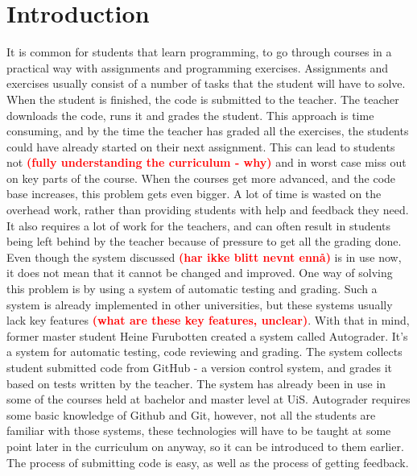 \documentclass[12pt,a4paper]{report}
\newcommand\worry[1]{\textcolor{red}{\textbf{\small{(#1)}}}}
\begin{document}
\chapter*{Introduction}

It is common for students that learn programming, to go through courses in a practical way with assignments and programming exercises. Assignments and exercises usually consist of a number of tasks that the student will have to solve. When the student is finished, the code is submitted to the teacher. The teacher downloads the code, runs it and grades the student. This approach is time consuming, and by the time the teacher has graded all the exercises, the students could have already started on their next assignment. This can lead to students not \worry{fully understanding the curriculum - why} and in worst case miss out on key parts of the course. When the courses get more advanced, and the code base increases, this problem gets even bigger. A lot of time is wasted on the overhead work, rather than providing students with help and feedback they need. It also requires a lot of work for the teachers, and can often result in students being left behind by the teacher because of pressure to get all the grading done. Even though the system discussed \worry{har ikke blitt nevnt ennå} is in use now, it does not mean that it cannot be changed and improved. One way of solving this problem is by using a system of automatic testing and grading. Such a system is already implemented in other universities, but these systems usually lack key features \worry{what are these key features, unclear}. With that in mind, former master student Heine Furubotten created a system called Autograder. It's a system for automatic testing, code reviewing and grading. The system collects student submitted code from GitHub - a version control system, and grades it based on tests written by the teacher. The system has already been in use in some of the courses held at bachelor and master level at UiS. Autograder requires some basic knowledge of Github and Git, however, not all the students are familiar with those systems, these technologies will have to be taught at some point later in the curriculum on anyway, so it can be introduced to them earlier. The process of submitting code is easy, as well as the process of getting feedback.
\end{document}
